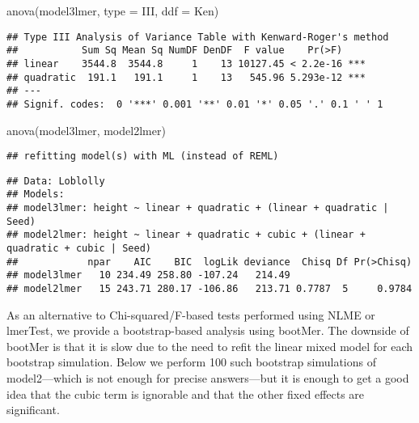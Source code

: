 \documentclass[
]{book}
\newenvironment{Shaded}{\begin{snugshade}}{\end{snugshade}}
\newcommand{\AttributeTok}[1]{\textcolor[rgb]{0.77,0.63,0.00}{#1}}
\newcommand{\FunctionTok}[1]{\textcolor[rgb]{0.00,0.00,0.00}{#1}}
\newcommand{\NormalTok}[1]{#1}
\newcommand{\StringTok}[1]{\textcolor[rgb]{0.31,0.60,0.02}{#1}}
\begin{document}
\begin{Shaded}
\begin{Highlighting}[]
\FunctionTok{anova}\NormalTok{(model3lmer, }\AttributeTok{type =} \StringTok{\textquotesingle{}III\textquotesingle{}}\NormalTok{, }\AttributeTok{ddf =} \StringTok{\textquotesingle{}Ken\textquotesingle{}}\NormalTok{)}
\end{Highlighting}
\end{Shaded}

\begin{verbatim}
## Type III Analysis of Variance Table with Kenward-Roger's method
##           Sum Sq Mean Sq NumDF DenDF  F value    Pr(>F)    
## linear    3544.8  3544.8     1    13 10127.45 < 2.2e-16 ***
## quadratic  191.1   191.1     1    13   545.96 5.293e-12 ***
## ---
## Signif. codes:  0 '***' 0.001 '**' 0.01 '*' 0.05 '.' 0.1 ' ' 1
\end{verbatim}

\begin{Shaded}
\begin{Highlighting}[]
\FunctionTok{anova}\NormalTok{(model3lmer, model2lmer)}
\end{Highlighting}
\end{Shaded}

\begin{verbatim}
## refitting model(s) with ML (instead of REML)
\end{verbatim}

\begin{verbatim}
## Data: Loblolly
## Models:
## model3lmer: height ~ linear + quadratic + (linear + quadratic | Seed)
## model2lmer: height ~ linear + quadratic + cubic + (linear + quadratic + cubic | Seed)
##            npar    AIC    BIC  logLik deviance  Chisq Df Pr(>Chisq)
## model3lmer   10 234.49 258.80 -107.24   214.49                     
## model2lmer   15 243.71 280.17 -106.86   213.71 0.7787  5     0.9784
\end{verbatim}

As an alternative to Chi-squared/F-based tests performed using NLME or lmerTest, we provide a bootstrap-based analysis using bootMer. The downside of bootMer is that it is slow due to the need to refit the linear mixed model for each bootstrap simulation. Below we perform 100 such bootstrap simulations of model2---which is not enough for precise answers---but it is enough to get a good idea that the cubic term is ignorable and that the other fixed effects are significant.
\end{document}
